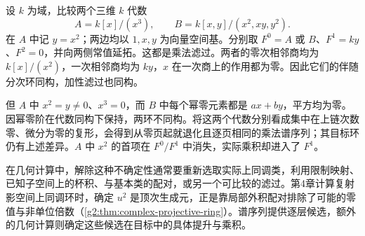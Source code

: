 \begin{example}\label{g2:exm:hidden-multiplicative-extension}
	设 \(k\) 为域，比较两个三维 \(k\) 代数
	\[
		A=k[x]/(x^3),\qquad B=k[x,y]/(x^2,xy,y^2).
	\]
	在 \(A\) 中记 \(y=x^2\)；两边均以 \(1,x,y\) 为向量空间基。分别取 \(F^0=A\) 或 \(B\)、\(F^1=ky\)、\(F^2=0\)，并向两侧常值延拓。这都是乘法滤过。两者的零次相邻商均为 \(k[x]/(x^2)\)，一次相邻商均为 \(ky\)，\(x\) 在一次商上的作用都为零。因此它们的伴随分次环同构，加性滤过也同构。

	但 \(A\) 中 \(x^2=y\ne0\)、\(x^3=0\)，而 \(B\) 中每个幂零元素都是 \(ax+by\)，平方均为零。因幂零阶在代数同构下保持，两环不同构。将这两个代数分别看成集中在上链次数零、微分为零的复形，会得到从零页起就退化且逐页相同的乘法谱序列；其目标环仍有上述差异。\(A\) 中 \(x^2\) 的首项在 \(F^0/F^1\) 中消失，实际乘积却进入了 \(F^1\)。
\end{example}

在几何计算中，解除这种不确定性通常要重新选取实际上同调类，利用限制映射、已知子空间上的杯积、与基本类的配对，或另一个可比较的滤过。第4章计算复射影空间上同调环时，确定 \(u^2\) 是顶次生成元，正是靠局部外积配对排除了可能的零值与非单位倍数（\cref{g2:thm:complex-projective-ring}）。谱序列提供逐层候选，额外的几何计算则确定这些候选在目标中的具体提升与乘积。

